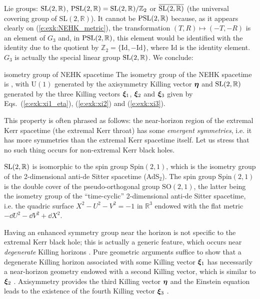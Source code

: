 Lie groups: $\mathrm{SL}(2,\mathbb{R})$, $\mathrm{PSL}(2,\mathbb{R}) = \mathrm{SL}(2,\mathbb{R})/\mathbb{Z}_2$
or $\overline{\mathrm{SL}(2,\mathbb{R})}$
(the universal covering group of $\mathrm{SL}(2, \mathbb{R})$).
It cannot be $\mathrm{PSL}(2,\mathbb{R})$ because, as it appears clearly on (\ref{e:exk:NEHK_metric}),
the transformation $(T,R) \mapsto (-T,-R)$ is an element of $G_3$ and, in $\mathrm{PSL}(2,\mathbb{R})$, this element would be identified with the identity
due to the quotient by $\mathbb{Z}_2 = \{\mathrm{Id}, -\mathrm{Id}\}$, where $\mathrm{Id}$
is the identity element.
$G_3$ is actually the
special linear group $\mathrm{SL}(2,\mathbb{R})$. We conclude:
\begin{tprop}{isometry group of NEHK spacetime}{}
The isometry group
of the NEHK spacetime is
\be \label{e:exk:NHEK_isometry_group}
     ,
\ee
with $\mathrm{U}(1)$ generated by the axisymmetry Killing vector $\bm{\eta}$ and
$\mathrm{SL}(2,\mathbb{R})$ generated by the three Killing vectors $\bm{\xi}_1$, $\bm{\xi}_2$ and
$\bm{\xi}_3$ given by Eqs.~(\ref{e:exk:xi1_eta}), (\ref{e:exk:xi2}) and (\ref{e:exk:xi3}).
\end{tprop}

This property is often phrased as follows: the near-horizon region of the extremal
Kerr spacetime (the extremal Kerr throat) has some
\emph{emergent symmetries}, i.e. it has
more symmetries than the extremal Kerr spacetime itself.
Let us stress that no such thing occurs for non-extremal Kerr black holes.

\begin{remark}
$\mathrm{SL}(2,\mathbb{R})$ is isomorphic to the spin group $\mathrm{Spin}(2,1)$,
which is the isometry group of the 2-dimensional anti-de Sitter spacetime (AdS$_2$).
The spin group $\mathrm{Spin}(2,1)$ is the double cover of the pseudo-orthogonal group $\mathrm{SO}(2,1)$, the latter being the isometry group of the ``time-cyclic'' 2-dimensional
anti-de Sitter spacetime, i.e. the quadric surface $X^2 - U^2 - V^2 = -1$ in
$\mathbb{R}^3$ endowed with the flat metric $-\dd U^2 - \dd V^2 + \dd X^2$.
\end{remark}

\begin{remark}
Having an enhanced symmetry group near the horizon is not specific to the
extremal Kerr black hole;
this is actually a generic feature, which occurs near \emph{degenerate} Killing horizons
\cite{KunduL13,Compe17}.
Pure geometric arguments suffice to show that a degenerate Killing horizon
associated with some Killing vector $\bm{\xi}_1$ has necessarily a near-horizon geometry
endowed with a second Killing vector, which is similar to $\bm{\xi}_2$ \cite{KunduL13}.
Axisymmetry provides the third Killing vector $\bm{\eta}$ and the Einstein equation
leads to the existence of the fourth Killing vector $\bm{\xi}_3$
\cite{KunduLR07}.
\end{remark}

